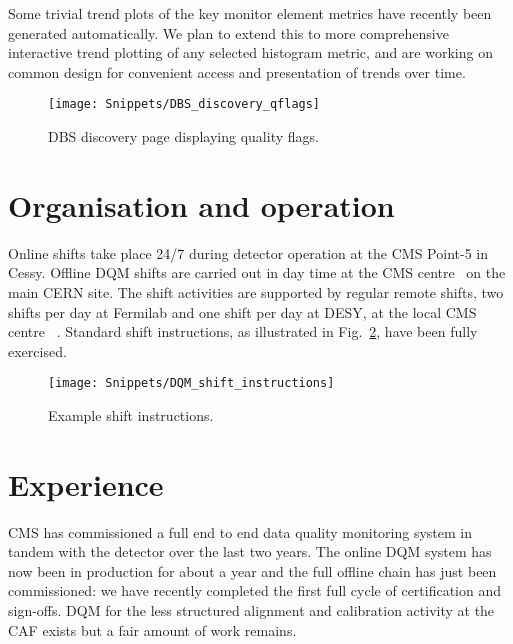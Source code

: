 \documentclass[a4paper]{jpconf}
\begin{document}
Some trivial trend plots of the key monitor element metrics have recently
been generated automatically.  We plan to extend this to more comprehensive
interactive trend plotting of any selected histogram metric, and are working
on common design for convenient access and presentation of trends over time.

\begin{figure}[!tbp]
\begin{center}
\texttt{[image: Snippets/DBS\_discovery\_qflags]}
\caption{\label{fig:dbsqflags}DBS discovery page displaying quality flags.}
\end{center}
\end{figure}


\section{Organisation and operation}

Online shifts take place 24/7 during detector operation at the CMS Point-5 in
Cessy.  Offline DQM shifts are carried out in day time at the CMS centre~%
\cite{cms_centres_09} on the main CERN site.  The shift activities are
supported by regular remote shifts, two shifts per day at Fermilab and one
shift per day at DESY, at the local CMS centre~%
\cite{collaboration_at_distance_09}.  Standard shift instructions, as
illustrated in Fig.~\ref{fig:shiftdoc}, have been fully exercised.

\begin{figure}[!tbp]
\begin{center}
\texttt{[image: Snippets/DQM\_shift\_instructions]}
\caption{\label{fig:shiftdoc}Example shift instructions.}
\end{center}
\end{figure}


\section{Experience}

CMS has commissioned a full end to end data quality monitoring system in
tandem with the detector over the last two years.  The online DQM system has
now been in production for about a year and the full offline chain has just
been commissioned: we have recently completed the first full cycle of
certification and sign-offs.  DQM for the less structured alignment and
calibration activity at the CAF exists but a fair amount of work remains.
\end{document}

